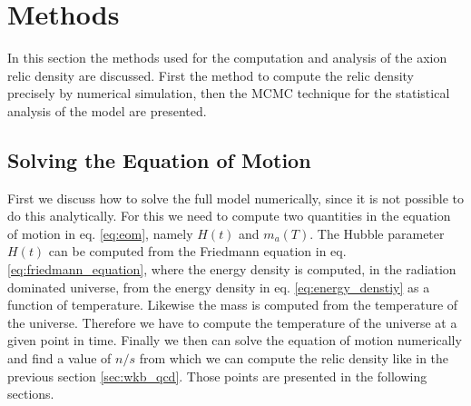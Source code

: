 \documentclass[twoside,a4paper, 12pt]{article}
\numberwithin{equation}{section}
\begin{document}

\section{Methods}
\label{sec:methods}
In this section the methods used for the computation and analysis
of the axion relic density are discussed.
First the method to compute the relic density precisely
by numerical simulation, then the MCMC technique 
for the statistical analysis of the model
are presented.


\subsection{Solving the Equation of Motion}
\label{sec:solving_the_eom_numerically}
First we discuss how to solve the full model numerically, since it is not possible to do this analytically.
For this we need to compute two quantities in the equation of motion in eq. \eqref{eq:eom},
namely $H(t)$ and $m_a(T)$.
The Hubble parameter $H(t)$ can be computed from the Friedmann equation in 
eq. \eqref{eq:friedmann_equation}, where the energy density is computed, in the radiation dominated 
universe, from the energy density in eq. \eqref{eq:energy_denstiy} as a function of 
temperature. Likewise the mass is computed from the temperature of the universe.
Therefore we have to compute the temperature of the universe at a given point in time.
Finally we then can solve the equation of motion numerically and find a value 
of $n / s$ from which we can compute the relic density like in the previous 
section \ref{sec:wkb_qcd}.
Those points are presented in the following sections.
\end{document}
